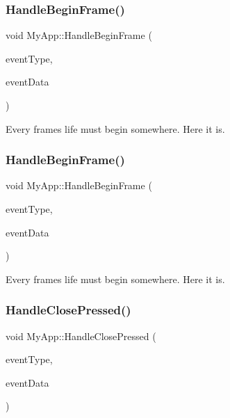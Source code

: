 \subsubsection{\texorpdfstring{HandleBeginFrame()}{HandleBeginFrame()}\hspace{0.1cm}{\footnotesize\ttfamily [1/2]}}
{\footnotesize\ttfamily void My\+App\+::\+Handle\+Begin\+Frame (\begin{DoxyParamCaption}\item[{String\+Hash}]{event\+Type,  }\item[{Variant\+Map \&}]{event\+Data }\end{DoxyParamCaption})\hspace{0.3cm}{\ttfamily [inline]}}

Every frame\textquotesingle{}s life must begin somewhere. Here it is. \mbox{\label{class_my_app_a009ad0629cfb490636e2cf876c1c99cd}} 
\subsubsection{\texorpdfstring{HandleBeginFrame()}{HandleBeginFrame()}\hspace{0.1cm}{\footnotesize\ttfamily [2/2]}}
{\footnotesize\ttfamily void My\+App\+::\+Handle\+Begin\+Frame (\begin{DoxyParamCaption}\item[{String\+Hash}]{event\+Type,  }\item[{Variant\+Map \&}]{event\+Data }\end{DoxyParamCaption})\hspace{0.3cm}{\ttfamily [inline]}}

Every frame\textquotesingle{}s life must begin somewhere. Here it is. \mbox{\label{class_my_app_a1c9c597a039a5c91da0c0b96fe64227c}} 
\subsubsection{\texorpdfstring{HandleClosePressed()}{HandleClosePressed()}}
{\footnotesize\ttfamily void My\+App\+::\+Handle\+Close\+Pressed (\begin{DoxyParamCaption}\item[{String\+Hash}]{event\+Type,  }\item[{Variant\+Map \&}]{event\+Data }\end{DoxyParamCaption})\hspace{0.3cm}{\ttfamily [inline]}}

